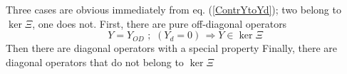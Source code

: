 \documentclass[aps,preprint]{revtex4}%
\begin{document}
Three cases are obvious immediately from eq. (\ref{ContrYtoYd}); two belong to
$\ker\Xi$, one does not. First, there are pure off-diagonal operators
\begin{equation}
Y=Y_{OD}\,\,;\,\,(Y_{d}=0)\,\Rightarrow Y\in\ker\Xi\label{Ycase1}%
\end{equation}
Then there are diagonal operators with a special property
Finally, there are diagonal operators that do not belong to $\ker\Xi$
\end{document}
